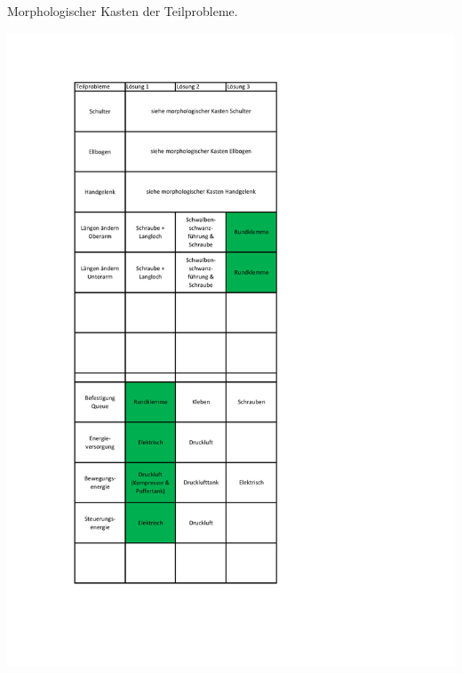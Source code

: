 	\begin{table}[h]
		\centering
		\caption[Morphologischer Kasten der Teilprobleme]{Morphologischer Kasten der Teilprobleme.}
		\centering
		\includegraphics[width=\textwidth]{Abb/Morphologischer_Kasten_Teilprobleme}
		\label{fig:morphologische-kasten-teilprobleme}
	\end{table}
%
